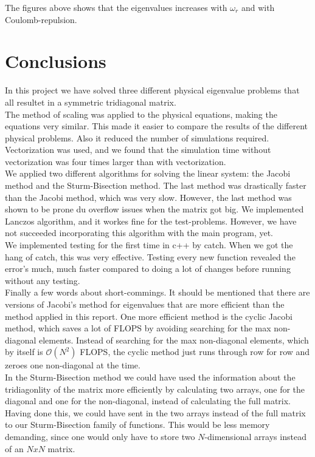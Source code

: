 \documentclass{article}
\begin{document}
The figures above shows that the eigenvalues increases with $\omega_r$ and with Coulomb-repulsion.


\section{Conclusions}
In this project we have solved three different physical eigenvalue problems that all resultet in a symmetric tridiagonal matrix. \\

The method of scaling was applied to the physical equations, making the equations very similar. This made it easier to compare the results of the different physical problems. Also it reduced the number of simulations required. \\

Vectorization was used, and we found that the simulation time without vectorization was four times larger than with vectorization.\\

We applied two different algorithms for solving the linear system: the Jacobi method and the Sturm-Bisection method. The last method was drastically faster than the Jacobi method, which was very slow. However, the last method was shown to be prone du overflow issues when the matrix got big. We implemented Lanczos algorithm, and it workes fine for the test-problems. However, we have not succeeded incorporating this algorithm with the main program, yet.\\

We implemented testing for the first time in c++ by catch. When we got the hang of catch, this was very effective. Testing every new function revealed the error's much, much faster compared to doing a lot of changes before running without any testing.\\

Finally a few words about short-commings. It should be mentioned that there are versions of Jacobi's method for eigenvalues that are more efficient than the method applied in this report. One more efficient method is the cyclic Jacobi method, which saves a lot of FLOPS by avoiding searching for the max non-diagonal elements. Instead of searching for the max non-diagonal elements, which by itself is $\mathcal{O}(N^2)$ FLOPS, the cyclic method just runs through row for row and zeroes one non-diagonal at the time.\\

In the Sturm-Bisection method we could have used the information about the tridiagonlity of the matrix more efficiently by calculating two arrays, one for the diagonal and one for the non-diagonal, instead of calculating the full matrix. Having done this, we could have sent in the two arrays instead of the full matrix to our Sturm-Bisection family of functions. This would be less memory demanding, since one would only have to store two $N$-dimensional arrays instead of an $N x N$ matrix.
\end{document}

